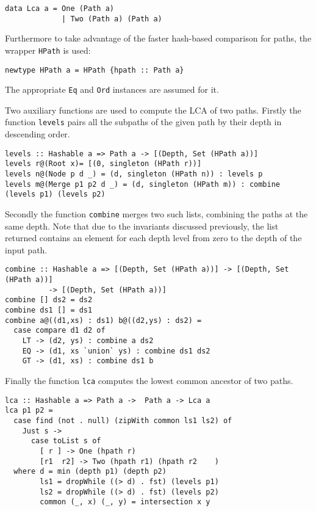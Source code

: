 \documentclass[../Thesis.tex]{subfiles}
\begin{document}
\begin{verbatim}
data Lca a = One (Path a)
             | Two (Path a) (Path a)
\end{verbatim}

	Furthermore to take advantage of the faster hash-based comparison
	for paths, the wrapper \texttt{HPath} is used:
	
\begin{verbatim}
newtype HPath a = HPath {hpath :: Path a}
\end{verbatim}
	The appropriate \texttt{Eq} and \texttt{Ord} instances are assumed for it.
	
	Two auxiliary functions are used to compute the LCA of two paths. Firstly the function \texttt{levels} pairs all the subpaths of the given path
	by their depth in descending order.


\begin{verbatim}	
levels :: Hashable a => Path a -> [(Depth, Set (HPath a))]
levels r@(Root x)= [(0, singleton (HPath r))]
levels n@(Node p d _) = (d, singleton (HPath n)) : levels p
levels m@(Merge p1 p2 d _) = (d, singleton (HPath m)) : combine (levels p1) (levels p2)
\end{verbatim}
	
	Secondly the function \texttt{combine} merges two such lists, combining the
	paths at the same depth. Note that due to the invariants discussed
	previously, the list returned contains an element for each depth level from
	zero to the depth of the input path.
	
\begin{verbatim}
combine :: Hashable a => [(Depth, Set (HPath a))] -> [(Depth, Set (HPath a))] 
          -> [(Depth, Set (HPath a))]
combine [] ds2 = ds2
combine ds1 [] = ds1
combine a@((d1,xs) : ds1) b@((d2,ys) : ds2) =
  case compare d1 d2 of
    LT -> (d2, ys) : combine a ds2
    EQ -> (d1, xs `union` ys) : combine ds1 ds2
    GT -> (d1, xs) : combine ds1 b
\end{verbatim}

	Finally the function \texttt{lca} computes the lowest common ancestor
	of two paths.

\begin{verbatim}
lca :: Hashable a => Path a ->  Path a -> Lca a
lca p1 p2 =
  case find (not . null) (zipWith common ls1 ls2) of
    Just s ->
      case toList s of
        [ r ] -> One (hpath r)
        [r1  r2] -> Two (hpath r1) (hpath r2	)
  where d = min (depth p1) (depth p2)
        ls1 = dropWhile ((> d) . fst) (levels p1)
        ls2 = dropWhile ((> d) . fst) (levels p2)
        common (_, x) (_, y) = intersection x y
\end{verbatim}
\end{document}
